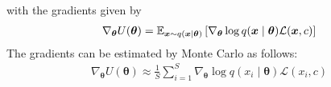 with the gradients given by
\begin{align}\label{eq:grad_estimator}
\nabla_{\boldsymbol{\theta}} U(\boldsymbol{\theta}) =\mathbb{E}_{\boldsymbol{x} \sim q(\boldsymbol{x} \mid \boldsymbol{\theta})}\left[\nabla_{\boldsymbol{\theta}} \log q(\boldsymbol{x} \mid \boldsymbol{\theta}) \mathcal{L}(\boldsymbol{x},c)\right]
\end{align}
%
The gradients can be estimated by Monte Carlo as follows:
\begin{align}\label{eq:VO_grad_estimator}
\nabla_{\boldsymbol{\theta}} U(\boldsymbol{\theta}) \approx 
\frac{1}{S} \sum_{i=1}^{S}
\nabla_{\boldsymbol{\theta}} \log q(x_i \mid \boldsymbol{\theta}) \mathcal{L}(x_i,c)
\end{align}

